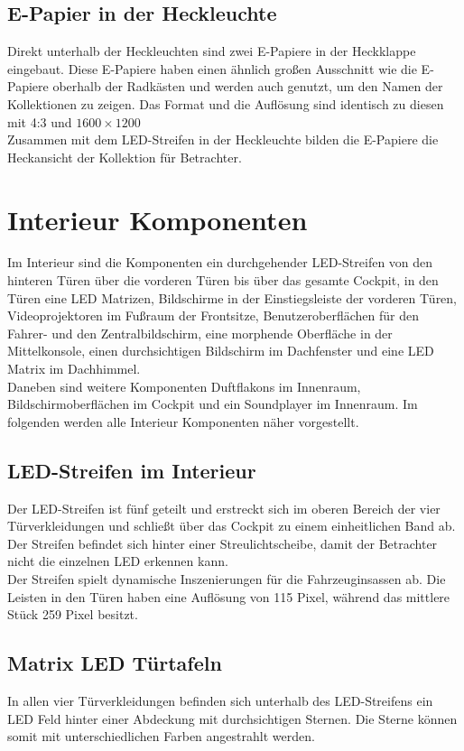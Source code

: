 \subsection{E-Papier in der Heckleuchte}
Direkt unterhalb der Heckleuchten sind zwei E-Papiere in der Heckklappe eingebaut.
Diese E-Papiere haben einen ähnlich großen Ausschnitt wie die E-Papiere oberhalb der Radkästen und werden auch genutzt, um den Namen der Kollektionen zu zeigen. Das Format und die Auflösung sind identisch zu diesen mit 4:3 und $ 1600\times1200 $\\
Zusammen mit dem LED-Streifen in der Heckleuchte bilden die E-Papiere die Heckansicht der Kollektion für Betrachter.
\section{Interieur Komponenten}
Im Interieur sind die Komponenten ein durchgehender LED-Streifen von den hinteren Türen über die vorderen Türen bis über das gesamte Cockpit, in den Türen eine LED Matrizen, Bildschirme in der Einstiegsleiste der vorderen Türen, Videoprojektoren im Fußraum der Frontsitze, Benutzeroberflächen für den Fahrer- und den Zentralbildschirm, eine morphende Oberfläche in der Mittelkonsole, einen durchsichtigen Bildschirm im Dachfenster und eine LED Matrix im Dachhimmel.\\
Daneben sind weitere Komponenten Duftflakons im Innenraum, Bildschirmoberflächen im Cockpit und ein Soundplayer im Innenraum.
Im folgenden werden alle Interieur Komponenten näher vorgestellt.
\subsection{LED-Streifen im Interieur}
Der LED-Streifen ist fünf geteilt und erstreckt sich im oberen Bereich der vier Türverkleidungen und schließt über das Cockpit zu einem einheitlichen Band ab. Der Streifen befindet sich hinter einer Streulichtscheibe, damit der Betrachter nicht die einzelnen LED erkennen kann. \\
Der Streifen spielt dynamische Inszenierungen für die Fahrzeuginsassen ab.
Die Leisten in den Türen haben eine Auflösung von 115 Pixel, während das mittlere Stück 259 Pixel besitzt.
\subsection{Matrix LED Türtafeln}
In allen vier Türverkleidungen befinden sich unterhalb des LED-Streifens ein LED Feld hinter einer Abdeckung mit durchsichtigen Sternen. Die Sterne können somit mit unterschiedlichen Farben angestrahlt werden.\\
